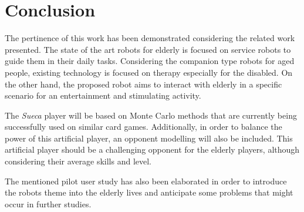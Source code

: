 \section{Conclusion} \label{sec:conclusion}

The pertinence of this work has been demonstrated considering the related work presented.
The state of the art robots for elderly is focused on service robots to guide them in their daily tasks.
Considering the companion type robots for aged people, existing technology is focused on therapy especially for the disabled.
On the other hand, the proposed robot aims to interact with elderly in a specific scenario for an entertainment and stimulating activity.

The \emph{Sueca} player will be based on Monte Carlo methods that are currently being successfully used on similar card games.
Additionally, in order to balance the power of this artificial player, an opponent modelling will also be included.
This artificial player should be a challenging opponent for the elderly players, although considering their average skills and level.

The mentioned pilot user study has also been elaborated in order to introduce the robots theme into the elderly lives and anticipate some problems that might occur in further studies.
